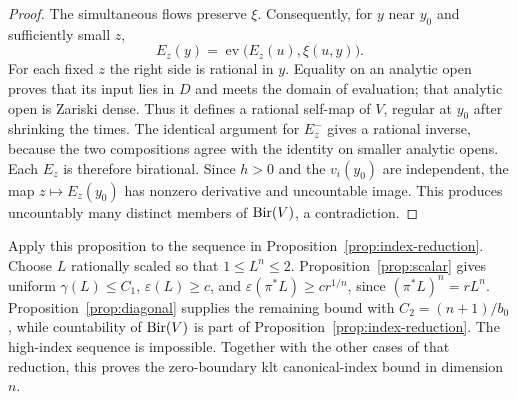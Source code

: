 \begin{proof}
The simultaneous flows preserve $\xi$. Consequently, for $y$
near $y_0$ and sufficiently small $z$,
\begin{equation}\label{eq:transport-flow-new}
 E_z(y)=\operatorname{ev}\bigl(E_z(u),\xi(u,y)\bigr).
\end{equation}
For each fixed $z$ the right side is rational in $y$. Equality
on an analytic open proves that its input lies in $D$ and meets
the domain of evaluation; that analytic open is Zariski dense.
Thus it defines a rational self-map of $V$, regular at $y_0$
after shrinking the times. The identical argument for $E_z^-$
gives a rational inverse, because the two compositions agree
with the identity on smaller analytic opens. Each $E_z$ is
therefore birational. Since $h>0$ and the $v_i(y_0)$ are
independent, the map $z\mapsto E_z(y_0)$ has nonzero derivative
and uncountable image. This produces uncountably many distinct
members of $\operatorname{Bir}(V)$, a contradiction.
\end{proof}

Apply this proposition to the sequence in
Proposition~\ref{prop:index-reduction}. Choose $L$ rationally
scaled so that $1\le L^n\le2$. Proposition~\ref{prop:scalar}
gives uniform $\gamma(L)\le C_1$, $\varepsilon(L)\ge c$, and
$\varepsilon(\pi^*L)\ge cr^{1/n}$, since
$(\pi^*L)^n=rL^n$. Proposition~\ref{prop:diagonal} supplies the
remaining bound with $C_2=(n+1)/b_0$, while countability of
$\operatorname{Bir}(V)$ is part of Proposition~\ref{prop:index-reduction}.
The high-index sequence is impossible. Together with the other
cases of that reduction, this proves the zero-boundary klt
canonical-index bound in dimension $n$.
